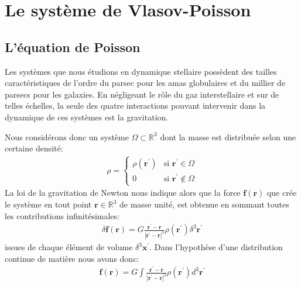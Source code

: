 
\section{Le système de Vlasov-Poisson}

\subsection{L'équation de Poisson}



Les systèmes que nous étudions en dynamique stellaire possèdent des tailles caractéristiques de l'ordre du parsec pour les amas globulaires et du
millier de parsecs pour les galaxies. En négligeant le rôle du gaz interstellaire et sur de telles échelles, la seule des quatre interactions pouvant
intervenir dans la dynamique de ces systèmes est la gravitation.

Nous considérons donc un système $\Omega\subset\mathbb{R}^{3}$ dont la masse est distribuée selon une certaine densité:
\begin{align*}
	\rho = \begin{cases}
		\rho(\mathbf{r}^{\prime}) & \text{si } \mathbf{r}^{\prime}\in\Omega\\
		0 & \text{si } \mathbf{r}^{\prime}\notin\Omega
	\end{cases}
\end{align*}
La loi de la gravitation de Newton nous indique alors que la force $\mathbf{f}(\mathbf{r})$ que crée le système en tout point
$\mathbf{r}\in\mathbb{R}^{3}$ de masse unité, est obtenue en sommant toutes les contributions infinitésimales:
\begin{align}
	\delta\mathbf{f}(\mathbf{r})=G\frac{\mathbf{r}^{\prime}-\mathbf{r}}{\left\vert\mathbf{r}^{\prime}-\mathbf{r}\right\vert ^{3}}\rho(\mathbf{r}^{\prime}%
	)\delta^{3}\mathbf{r}^{\prime}\label{poisss}%
\end{align}
issues de chaque élément de volume $\delta^{3}\mathbf{x}^{\prime}$. Dans l'hypothèse d'une distribution continue de matière nous avons donc:
\begin{align}
	\mathbf{f}(\mathbf{r})=G\displaystyle\int\frac{\mathbf{r}^{\prime}-\mathbf{r}}{\left\vert \mathbf{r}^{\prime}-\mathbf{r}\right\vert ^{3}}\rho
	(\mathbf{r}^{\prime})d^{3}\mathbf{r}^{\prime}\label{eq1}%
\end{align}


